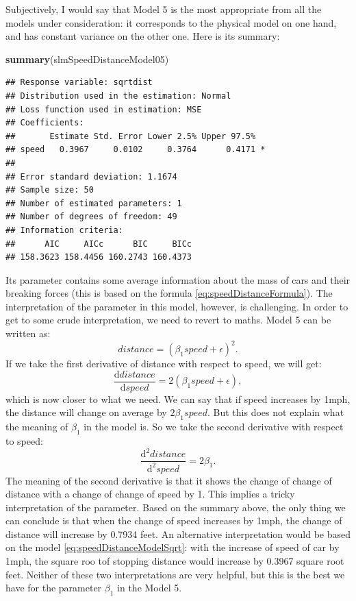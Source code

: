 \documentclass[
]{book}
\newenvironment{Shaded}{\begin{snugshade}}{\end{snugshade}}
\newcommand{\KeywordTok}[1]{\textcolor[rgb]{0.13,0.29,0.53}{\textbf{#1}}}
\newcommand{\NormalTok}[1]{#1}
\theoremstyle{definition}
\theoremstyle{definition}
\theoremstyle{definition}
\theoremstyle{definition}
\theoremstyle{remark}
\begin{document}
Subjectively, I would say that Model 5 is the most appropriate from all the models under consideration: it corresponds to the physical model on one hand, and has constant variance on the other one. Here is its summary:

\begin{Shaded}
\begin{Highlighting}[]
\KeywordTok{summary}\NormalTok{(slmSpeedDistanceModel05)}
\end{Highlighting}
\end{Shaded}

\begin{verbatim}
## Response variable: sqrtdist
## Distribution used in the estimation: Normal
## Loss function used in estimation: MSE
## Coefficients:
##       Estimate Std. Error Lower 2.5% Upper 97.5%  
## speed   0.3967     0.0102     0.3764      0.4171 *
## 
## Error standard deviation: 1.1674
## Sample size: 50
## Number of estimated parameters: 1
## Number of degrees of freedom: 49
## Information criteria:
##      AIC     AICc      BIC     BICc 
## 158.3623 158.4456 160.2743 160.4373
\end{verbatim}

Its parameter contains some average information about the mass of cars and their breaking forces (this is based on the formula \eqref{eq:speedDistanceFormula}). The interpretation of the parameter in this model, however, is challenging. In order to get to some crude interpretation, we need to revert to maths. Model 5 can be written as:
\begin{equation}
    distance = (\beta_1 speed + \epsilon)^2 .
    \label{eq:speedDistanceModelSqrt3}
\end{equation}
If we take the first derivative of distance with respect to speed, we will get:
\begin{equation}
    \frac{\mathrm{d}distance}{\mathrm{d}speed} = 2 (\beta_1 speed + \epsilon) ,
    \label{eq:speedDistanceModelSqrt4}
\end{equation}
which is now closer to what we need. We can say that if speed increases by 1mph, the distance will change on average by \(2 \beta_1 speed\). But this does not explain what the meaning of \(\beta_1\) in the model is. So we take the second derivative with respect to speed:
\begin{equation}
    \frac{\mathrm{d}^2 distance}{\mathrm{d}^2 speed} = 2 \beta_1 .
    \label{eq:speedDistanceModelSqrt5}
\end{equation}
The meaning of the second derivative is that it shows the change of change of distance with a change of change of speed by 1. This implies a tricky interpretation of the parameter. Based on the summary above, the only thing we can conclude is that when the change of speed increases by 1mph, the change of distance will increase by 0.7934 feet. An alternative interpretation would be based on the model \eqref{eq:speedDistanceModelSqrt}: with the increase of speed of car by 1mph, the square roo tof stopping distance would increase by 0.3967 square root feet. Neither of these two interpretations are very helpful, but this is the best we have for the parameter \(\beta_1\) in the Model 5.
\end{document}
